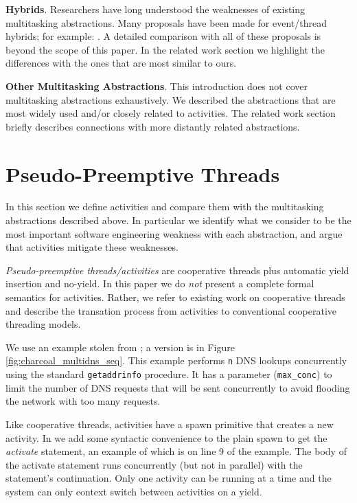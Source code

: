 \documentclass[9pt,preprint]{sigplanconf}
\begin{document}
\textbf{Hybrids}.
Researchers have long understood the weaknesses of existing multitasking abstractions.
Many proposals have been made for event/thread hybrids; for example: \cite{Boudol2007, Boussinot2006, Cunningham2005, Dabrowski2006, Fischer2007, Kerneis2014, Krohn2007, Li2007, Behren2003}.
A detailed comparison with all of these proposals is beyond the scope of this paper.
In the related work section we highlight the differences with the ones that are most similar to ours.

\textbf{Other Multitasking Abstractions}.
This introduction does not cover multitasking abstractions exhaustively.
We described the abstractions that are most widely used and/or closely related to activities.
The related work section briefly describes connections with more distantly related abstractions.

\section{Pseudo-Preemptive Threads}

In this section we define activities and compare them with the multitasking abstractions described above.
In particular we identify what we consider to be the most important software engineering weakness with each abstraction, and argue that activities mitigate these weaknesses.

\emph{Pseudo-preemptive threads\slash{}activities} are cooperative threads plus automatic yield insertion and no-yield.
In this paper we do \emph{not} present a complete formal semantics for activities.
Rather, we refer to existing work on cooperative threads \cite{Abadi2009} and describe the transation process from activities to conventional cooperative threading models.

We use an example stolen from \cite{Krohn2007}; a \charcoal{} version is in Figure \ref{fig:charcoal_multidns_seq}.
This example performs \texttt{n} DNS lookups concurrently using the standard \texttt{getaddrinfo} procedure.
It has a parameter (\texttt{max\_conc}) to limit the number of DNS requests that will be sent concurrently to avoid flooding the network with too many requests.

Like cooperative threads, activities have a spawn primitive that creates a new activity.
In \charcoal{} we add some syntactic convenience to the plain spawn to get the \emph{activate} statement, an example of which is on line 9 of the example.
The body of the activate statement runs concurrently (but not in parallel) with the statement's continuation.
Only one activity can be running at a time and the system can only context switch between activities on a yield.
\end{document}
